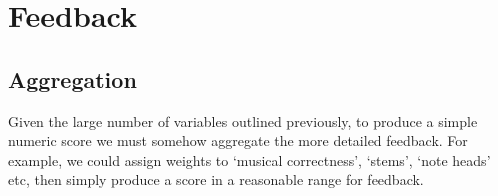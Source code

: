 \section{Feedback}


\subsection{Aggregation}
Given the large number of variables outlined previously, to produce a simple numeric score we must somehow aggregate the more detailed feedback. For example, we could assign weights to `musical correctness', `stems', `note heads' etc, then simply produce a score in a reasonable range for feedback.